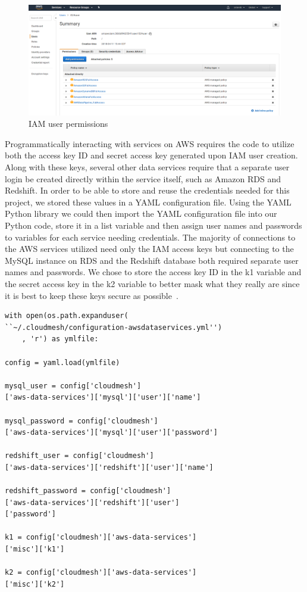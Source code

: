 \begin{figure}[!ht]
  \centering\includegraphics[width=\columnwidth]{images/iam.png}
  \caption{IAM user permissions}\label{f:iam}
\end{figure}

Programmatically interacting with services on AWS requires the code to utilize 
both the access key ID and secret access key generated upon IAM user creation. 
Along with these keys, several other data services require that a separate 
user login be created directly within the service itself, such as Amazon RDS 
and Redshift. In order to be able to store and reuse the credentials needed 
for this project, we stored these values in a YAML configuration file. Using 
the YAML Python library we could then import the YAML configuration file into 
our Python code, store it in a list variable and then assign user names and 
passwords to variables for each service needing credentials. The majority of 
connections to the AWS services utilized need only the IAM access keys but 
connecting to the MySQL instance on RDS and the Redshift database both 
required separate user names and passwords. We chose to store the access key 
ID in the k1 variable and the secret access key in the k2 variable to better 
mask what they really are since it is best to keep these keys secure as 
possible~\cite{hid-sp18-521-IAMkeys}. 

\begin{verbatim}
with open(os.path.expanduser(
``~/.cloudmesh/configuration-awsdataservices.yml'')
	, 'r') as ymlfile:

config = yaml.load(ymlfile)

mysql_user = config['cloudmesh']
['aws-data-services']['mysql']['user']['name']

mysql_password = config['cloudmesh']
['aws-data-services']['mysql']['user']['password']

redshift_user = config['cloudmesh']
['aws-data-services']['redshift']['user']['name']

redshift_password = config['cloudmesh']
['aws-data-services']['redshift']['user']
['password']

k1 = config['cloudmesh']['aws-data-services']
['misc']['k1']

k2 = config['cloudmesh']['aws-data-services']
['misc']['k2']
\end{verbatim}


